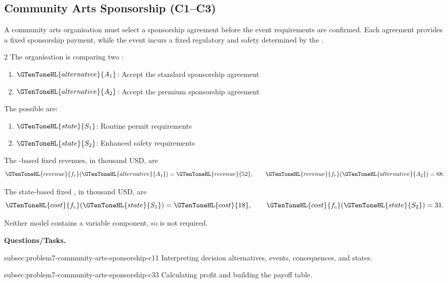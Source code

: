 \subsection{Community Arts Sponsorship (C1--C3)}
\label{sec:problem7-community-arts-sponsorship-c1-c3}

A community arts organisation must select a sponsorship agreement before the
event requirements are confirmed. Each agreement provides a fixed sponsorship
payment, while the event incurs a fixed regulatory and safety  determined
by the   .

\begin{multicols}{2}
	The organisation is comparing two :
	\begin{enumerate}[label=\arabic*.]
		\item \(\GTenToneHL{alternative}{A_1}\): Accept the standard sponsorship agreement
		\item \(\GTenToneHL{alternative}{A_2}\): Accept the premium sponsorship agreement
	\end{enumerate}
	
	The possible    are:
	\begin{enumerate}[label=\arabic*.]
		\item \(\GTenToneHL{state}{S_1}\): Routine permit requirements
		\item \(\GTenToneHL{state}{S_2}\): Enhanced safety requirements
	\end{enumerate}
	
	\columnbreak
	
	The -based fixed revenues, in thousand USD, are
	\[
	\GTenToneHL{revenue}{f_r}(\GTenToneHL{alternative}{A_1})=\GTenToneHL{revenue}{52},
	\qquad
	\GTenToneHL{revenue}{f_r}(\GTenToneHL{alternative}{A_2})=68.
	\]
	
	The state-based fixed , in thousand USD, are
	\[
	\GTenToneHL{cost}{f_c}(\GTenToneHL{state}{S_1})=\GTenToneHL{cost}{18},
	\qquad
	\GTenToneHL{cost}{f_c}(\GTenToneHL{state}{S_2})=31.
	\]
	
	Neither model contains a variable component, so  is not required.
\end{multicols}

\textbf{Questions/Tasks.}
\begin{enumerate}
	\CriterionTask
	{subsec:problem7-community-arts-sponsorship-c1}{1}
	{Interpreting decision alternatives, events, consequences, and states.}

	\CriterionTask
	{subsec:problem7-community-arts-sponsorship-c3}{3}
	{Calculating profit and building the payoff table.}
\end{enumerate}

